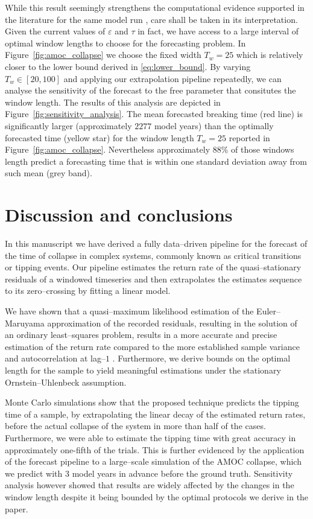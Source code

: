 \documentclass[openacc]{rsproca_new}
\begin{document}
While this result seemingly strengthens the computational evidence supported in the literature for the same model run \cite{vanWesten2024,Smolders2025}, care shall be taken in its interpretation.
Given the current values of $\varepsilon$ and $\tau$ in fact, we have access to a large interval of optimal window lengths to choose for the forecasting problem.
In Figure~\ref{fig:amoc_collapse} we choose the fixed width $T_w=25$ which is relatively closer to the lower bound derived in \eqref{eq:lower_bound}.
By varying $T_w\in[20,100]$ and applying our extrapolation pipeline repeatedly, we can analyse the sensitivity of the forecast to the free parameter that consitutes the window length.
The results of this analysis are depicted in Figure~\ref{fig:sensitivity_analysis}.
The mean forecasted breaking time (red line) is significantly larger (approximately $2277$ model years) than the optimally forecasted time (yellow star) for the window length $T_w=25$ reported in Figure~\ref{fig:amoc_collapse}.
Nevertheless approximately $88\%$ of those windows length predict a forecasting time that is within one standard deviation away from such mean (grey band).

\section{Discussion and conclusions}\label{sec:conclusion}
In this manuscript we have derived a fully data--driven pipeline for the forecast of the time of collapse in complex systems, commonly known as critical transitions or tipping events.
Our pipeline estimates the return rate of the quasi--stationary residuals of a windowed timeseries and then extrapolates the estimates sequence to its zero--crossing by fitting a linear model.

We have shown that a quasi--maximum likelihood estimation of the Euler--Maruyama approximation of the recorded residuals, resulting in the solution of an ordinary least--squares problem, results in a more accurate and precise estimation of the return rate compared to the more established sample variance \cite{Kuehn2011} and autocorrelation at lag--$1$ \cite{Boers2021}.
Furthermore, we derive bounds on the optimal length for the sample to yield meaningful estimations under the stationary Ornstein--Uhlenbeck assumption.

Monte Carlo simulations show that the proposed technique predicts the tipping time of a sample, by extrapolating the linear decay of the estimated return rates, before the actual collapse of the system in more than half of the cases.
Furthermore, we were able to estimate the tipping time with great accuracy in approximately one-fifth of the trials.
This is further evidenced by the application of the forecast pipeline to a large--scale simulation of the AMOC collapse, which we predict with $3$ model years in advance before the ground truth.
Sensitivity analysis however showed that results are widely affected by the changes in the window length despite it being bounded by the optimal protocols we derive in the paper.
\end{document}
